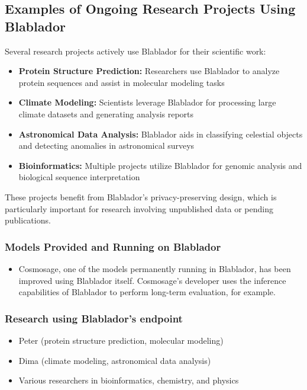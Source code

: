 \documentclass[10pt,conference]{IEEEtran}
\begin{document}
\subsection{Examples of Ongoing Research Projects Using Blablador}

Several research projects actively use Blablador for their scientific work:

\begin{itemize}
    \item \textbf{Protein Structure Prediction:} Researchers use Blablador to analyze protein sequences and assist in molecular modeling tasks
    \item \textbf{Climate Modeling:} Scientists leverage Blablador for processing large climate datasets and generating analysis reports
    \item \textbf{Astronomical Data Analysis:} Blablador aids in classifying celestial objects and detecting anomalies in astronomical surveys
    \item \textbf{Bioinformatics:} Multiple projects utilize Blablador for genomic analysis and biological sequence interpretation
\end{itemize}

These projects benefit from Blablador's privacy-preserving design, which is particularly important for research involving unpublished data or pending publications.

\subsubsection{Models Provided and Running on Blablador}
\begin{itemize}
    \item Cosmosage, one of the models permanently running in Blablador, has been improved using Blablador itself. Cosmosage's developer uses the inference capabilities of Blablador to perform long-term evaluation, for example.
\end{itemize}

\subsubsection{Research using Blablador's endpoint}
\begin{itemize}
    \item Peter (protein structure prediction, molecular modeling)
    \item Dima (climate modeling, astronomical data analysis)
    \item Various researchers in bioinformatics, chemistry, and physics
\end{itemize}
\end{document}
